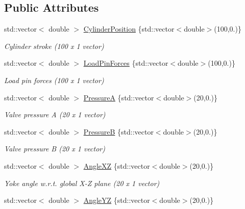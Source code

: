 \subsection*{Public Attributes}
\begin{DoxyCompactItemize}
\item 
std\+::vector$<$ double $>$ \hyperlink{classlusetstatenamespace_1_1LusetState_a977acdb1439507d42bc21c2c8722b711}{Cylinder\+Position} \{std\+::vector$<$double$>$(100,0.)\}
\begin{DoxyCompactList}\small\item\em Cylinder stroke (100 x 1 vector) \end{DoxyCompactList}\item 
std\+::vector$<$ double $>$ \hyperlink{classlusetstatenamespace_1_1LusetState_af9d0d5b3b032a3741076dd8634f5d94e}{Load\+Pin\+Forces} \{std\+::vector$<$double$>$(100,0.)\}
\begin{DoxyCompactList}\small\item\em Load pin forces (100 x 1 vector) \end{DoxyCompactList}\item 
std\+::vector$<$ double $>$ \hyperlink{classlusetstatenamespace_1_1LusetState_a0abcd02e8f1c180bc12c1ede94374c74}{PressureA} \{std\+::vector$<$double$>$(20,0.)\}
\begin{DoxyCompactList}\small\item\em Valve pressure A (20 x 1 vector) \end{DoxyCompactList}\item 
std\+::vector$<$ double $>$ \hyperlink{classlusetstatenamespace_1_1LusetState_a2801e7d85681d309b947e5285674fcb7}{PressureB} \{std\+::vector$<$double$>$(20,0.)\}
\begin{DoxyCompactList}\small\item\em Valve pressure B (20 x 1 vector) \end{DoxyCompactList}\item 
std\+::vector$<$ double $>$ \hyperlink{classlusetstatenamespace_1_1LusetState_a571d0cb66524884ec5efb50ca0ebc778}{Angle\+XZ} \{std\+::vector$<$double$>$(20,0.)\}
\begin{DoxyCompactList}\small\item\em Yoke angle w.\+r.\+t. global X-\/Z plane (20 x 1 vector) \end{DoxyCompactList}\item 
std\+::vector$<$ double $>$ \hyperlink{classlusetstatenamespace_1_1LusetState_a4820051aac72f4156e44862d401e70b0}{Angle\+YZ} \{std\+::vector$<$double$>$(20,0.)\}

\end{DoxyCompactItemize}
